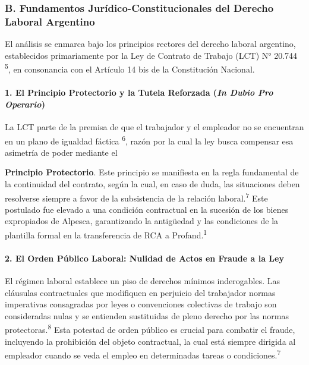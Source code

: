 \documentclass[]{article}
\begin{document}
\hypertarget{b.-fundamentos-juruxeddico-constitucionales-del-derecho-laboral-argentino}{%
\subsubsection{B. Fundamentos Jurídico-Constitucionales del Derecho
Laboral
Argentino}\label{b.-fundamentos-juruxeddico-constitucionales-del-derecho-laboral-argentino}}

El análisis se enmarca bajo los principios rectores del derecho laboral
argentino, establecidos primariamente por la Ley de Contrato de Trabajo
(LCT) N° 20.744 \textsuperscript{5}, en consonancia con el Artículo 14
bis de la Constitución Nacional.

\hypertarget{el-principio-protectorio-y-la-tutela-reforzada-in-dubio-pro-operario}{%
\paragraph{\texorpdfstring{1. El Principio Protectorio y la Tutela
Reforzada (\emph{\textbf{In Dubio Pro
Operario}})}{1. El Principio Protectorio y la Tutela Reforzada (In Dubio Pro Operario)}}\label{el-principio-protectorio-y-la-tutela-reforzada-in-dubio-pro-operario}}

La LCT parte de la premisa de que el trabajador y el empleador no se
encuentran en un plano de igualdad fáctica \textsuperscript{6}, razón
por la cual la ley busca compensar esa asimetría de poder mediante el

\textbf{Principio Protectorio}. Este principio se manifiesta en la regla
fundamental de la continuidad del contrato, según la cual, en caso de
duda, las situaciones deben resolverse siempre a favor de la
subsistencia de la relación laboral.\textsuperscript{7} Este postulado
fue elevado a una condición contractual en la sucesión de los bienes
expropiados de Alpesca, garantizando la antigüedad y las condiciones de
la plantilla formal en la transferencia de RCA a
Profand.\textsuperscript{1}

\hypertarget{el-orden-puxfablico-laboral-nulidad-de-actos-en-fraude-a-la-ley}{%
\paragraph{2. El Orden Público Laboral: Nulidad de Actos en Fraude a la
Ley}\label{el-orden-puxfablico-laboral-nulidad-de-actos-en-fraude-a-la-ley}}

El régimen laboral establece un piso de derechos mínimos inderogables.
Las cláusulas contractuales que modifiquen en perjuicio del trabajador
normas imperativas consagradas por leyes o convenciones colectivas de
trabajo son consideradas nulas y se entienden sustituidas de pleno
derecho por las normas protectoras.\textsuperscript{8} Esta potestad de
orden público es crucial para combatir el fraude, incluyendo la
prohibición del objeto contractual, la cual está siempre dirigida al
empleador cuando se veda el empleo en determinadas tareas o
condiciones.\textsuperscript{7}
\end{document}
